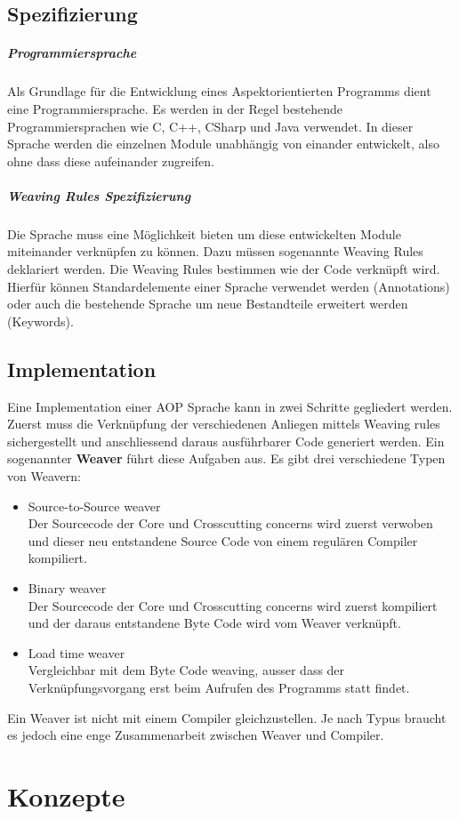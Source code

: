 \subsection{Spezifizierung}
\subparagraph{Programmiersprache}
Als Grundlage für die Entwicklung eines Aspektorientierten Programms dient eine Programmiersprache. Es werden in der Regel bestehende Programmiersprachen wie C, C++, CSharp und Java verwendet. In dieser Sprache werden die einzelnen Module unabhängig von einander entwickelt, also ohne dass diese aufeinander zugreifen.
\subparagraph{Weaving Rules Spezifizierung}
Die Sprache muss eine Möglichkeit bieten um diese entwickelten Module miteinander verknüpfen zu können. Dazu müssen sogenannte Weaving Rules deklariert werden. Die Weaving Rules bestimmen wie der Code verknüpft wird. Hierfür können Standardelemente einer Sprache verwendet werden (Annotations) oder auch die bestehende Sprache um neue Bestandteile erweitert werden (Keywords).
\subsection{Implementation}
Eine Implementation einer AOP Sprache kann in zwei Schritte gegliedert werden. Zuerst muss die Verknüpfung der verschiedenen Anliegen mittels Weaving rules sichergestellt und anschliessend daraus  ausführbarer Code generiert werden. Ein sogenannter \textbf{Weaver} führt diese Aufgaben aus. Es gibt drei verschiedene Typen von Weavern:

\begin{itemize}
\item Source-to-Source weaver \\ Der Sourcecode der Core und Crosscutting concerns wird zuerst verwoben und dieser neu entstandene Source Code von einem regulären Compiler kompiliert. 
\item Binary weaver \\ Der Sourcecode der Core und Crosscutting concerns wird zuerst kompiliert und der daraus entstandene Byte Code wird vom Weaver verknüpft.
\item Load time weaver \\ Vergleichbar mit dem Byte Code weaving, ausser dass der Verknüpfungsvorgang erst beim Aufrufen des Programms statt findet.
\end{itemize}

Ein Weaver ist nicht mit einem Compiler gleichzustellen. Je nach Typus braucht es jedoch eine enge Zusammenarbeit zwischen Weaver und Compiler.

\section{Konzepte}

